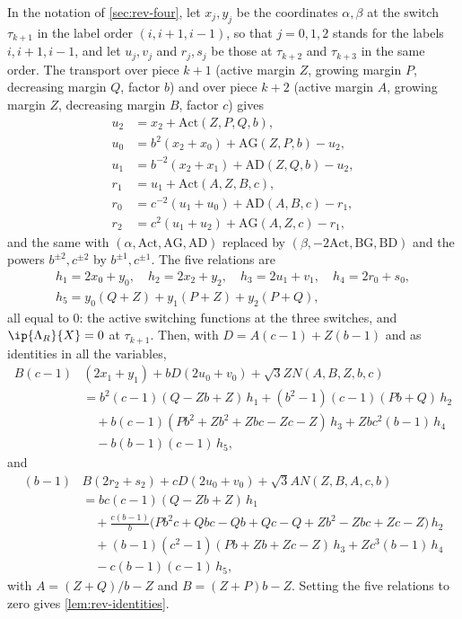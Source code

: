 In the notation of \cref{sec:rev-four}, let $x_j,y_j$ be the coordinates $\alpha,\beta$ at the
switch $\tau_{k+1}$ in the label order $(i,i+1,i-1)$, so that $j=0,1,2$ stands for the labels
$i,i+1,i-1$, and let $u_j,v_j$ and $r_j,s_j$ be those at $\tau_{k+2}$ and $\tau_{k+3}$ in the same
order. The transport over piece $k+1$ (active margin $Z$, growing margin $P$, decreasing margin
$Q$, factor $b$) and over piece $k+2$ (active margin $A$, growing margin $Z$, decreasing margin
$B$, factor $c$) gives
\begin{align*}
  u_2&=x_2+\mathrm{Act}(Z,P,Q,b),\\
  u_0&=b^2(x_2+x_0)+\mathrm{AG}(Z,P,b)-u_2,\\
  u_1&=b^{-2}(x_2+x_1)+\mathrm{AD}(Z,Q,b)-u_2,\\
  r_1&=u_1+\mathrm{Act}(A,Z,B,c),\\
  r_0&=c^{-2}(u_1+u_0)+\mathrm{AD}(A,B,c)-r_1,\\
  r_2&=c^2(u_1+u_2)+\mathrm{AG}(A,Z,c)-r_1,
\end{align*}
and the same with $(\alpha,\mathrm{Act},\mathrm{AG},\mathrm{AD})$ replaced by
$(\beta,-2\mathrm{Act},\mathrm{BG},\mathrm{BD})$ and the powers $b^{\pm2},c^{\pm2}$ by
$b^{\pm1},c^{\pm1}$. The five relations are
\begin{gather*}
  h_1=2x_0+y_0,\quad h_2=2x_2+y_2,\quad h_3=2u_1+v_1,\quad h_4=2r_0+s_0,\\
  h_5=y_0(Q+Z)+y_1(P+Z)+y_2(P+Q),
\end{gather*}
all equal to $0$: the active switching functions at the three switches, and
$\ip{\Lambda_R}{X}=0$ at $\tau_{k+1}$. Then, with $D=A(c-1)+Z(b-1)$ and as identities in all the
variables,
\begin{align*}
  B(c-1)&(2x_1+y_1)+bD(2u_0+v_0)+\sqrt3ZN(A,B,Z,b,c)\\
  &=b^2(c-1)(Q-Zb+Z)\,h_1+(b^2-1)(c-1)(Pb+Q)\,h_2\\
  &\quad+b(c-1)(Pb^2+Zb^2+Zbc-Zc-Z)\,h_3+Zbc^2(b-1)\,h_4\\
  &\quad-b(b-1)(c-1)\,h_5,
\end{align*}
and
\begin{align*}
  (b-1)&B(2r_2+s_2)+cD(2u_0+v_0)+\sqrt3AN(Z,B,A,c,b)\\
  &=bc(c-1)(Q-Zb+Z)\,h_1\\
  &\quad+\tfrac{c(b-1)}{b}\bigl(Pb^2c+Qbc-Qb+Qc-Q+Zb^2-Zbc+Zc-Z\bigr)\,h_2\\
  &\quad+(b-1)(c^2-1)(Pb+Zb+Zc-Z)\,h_3+Zc^3(b-1)\,h_4\\
  &\quad-c(b-1)(c-1)\,h_5,
\end{align*}
with $A=(Z+Q)/b-Z$ and $B=(Z+P)b-Z$. Setting the five
relations to zero gives \cref{lem:rev-identities}.

